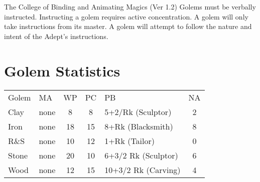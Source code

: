 \begin{Chapter}{The College of Binding and Animating Magics (Ver 1.2)}
Golems must be verbally instructed.  Instructing a golem requires
active concentration. A golem will only take instructions from its
master.  A golem will attempt to follow the nature and intent of the
Adept’s instructions.


\section{Golem Statistics}

\begin{small}
\begin{tabularx}{\columnwidth}{llccXc} \\
Golem	& MA	& WP	& PC	& PB			& NA \\
Clay	& none	& 8	& 8	& 5+2/Rk (Sculptor)	& 2 \\
Iron	& none	& 18	& 15	& 8+Rk (Blacksmith)	& 8 \\
R\&S	& none	& 10	& 12	& 1+Rk (Tailor)		& 0 \\
Stone	& none	& 20	& 10	& 6+3/2 Rk (Sculptor)	& 6 \\
Wood	& none	& 12	& 15	& 10+3/2 Rk (Carving)	& 4 \\
\end{tabularx} 
\end{small}


\end{Chapter}

